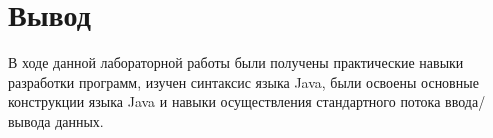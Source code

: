 \documentclass[14pt, a4paper]{extarticle}
\begin{document}
\section*{Вывод}
В ходе данной лабораторной работы были получены практические навыки разработки программ, изучен синтаксис языка Java, были освоены основные конструкции языка Java и навыки осуществления стандартного потока ввода/вывода данных.
\end{document}
